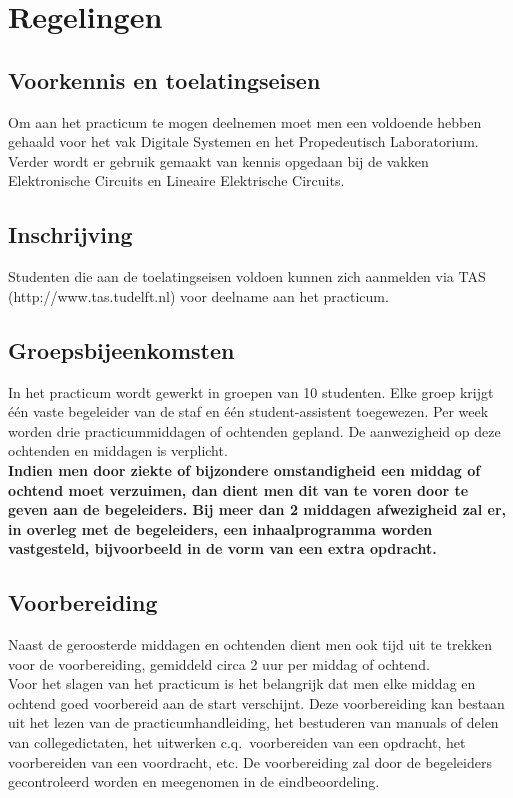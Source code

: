 \section{Regelingen}
\subsection{Voorkennis en toelatingseisen}
Om aan het practicum te mogen deelnemen moet men 
een voldoende hebben gehaald voor het vak
Digitale Systemen en het Propedeutisch Laboratorium.
Verder wordt er gebruik gemaakt van kennis opgedaan bij de vakken
Elektroni\-sche Circuits en Lineaire Elektrische Circuits.
\subsection{Inschrijving}
Studenten die aan de toelatingseisen voldoen kunnen
zich aanmelden via TAS (http://www.tas.tudelft.nl)
voor deelname aan het practicum.
\subsection{Groepsbijeenkomsten}
In het practicum wordt gewerkt in groepen van 10 studenten. Elke groep
krijgt \'e\'en vaste begeleider van de staf 
en \'e\'en student-assistent toegewezen. 
Per week worden drie
practicummiddagen of och\-tenden gepland. De aanwezigheid op deze
ochtenden en middagen is verplicht. \\
{\bf Indien men door ziekte of bijzondere
omstandigheid een middag of ochtend moet verzuimen, dan dient men dit
van te voren door te geven aan de begeleiders. Bij meer dan 2 middagen
afwezigheid zal er, in overleg met de begeleiders, een inhaalprogramma
worden vastgesteld, bijvoorbeeld in de vorm van een extra opdracht.}
\subsection{Voorbereiding}
Naast de geroosterde middagen en ochtenden dient men ook tijd uit
te trekken voor de voorbereiding, gemiddeld circa 2 uur per middag of
ochtend.\\
Voor het slagen van het practicum is het belangrijk dat men elke middag
en ochtend goed voorbereid aan de start verschijnt. Deze voorbereiding
kan bestaan uit het lezen van de practicumhandleiding, het bestuderen
van manuals of delen van collegedictaten,
het uitwerken c.q.\ voorbereiden van een opdracht,
het voorbereiden van een voordracht, etc.
De voorbereiding zal door de begeleiders gecontroleerd worden en
meegenomen in de eindbeoordeling.
